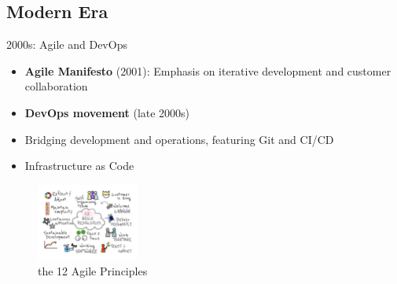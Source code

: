 \documentclass{beamer}
\begin{document}
\subsection{Modern Era}

\begin{frame}[t]{2000s: Agile and DevOps}
    \begin{itemize}
        \item \textbf{Agile Manifesto} (2001):  Emphasis on iterative development and customer collaboration
        \item \textbf{DevOps movement} (late 2000s)
        \item Bridging development and operations, featuring Git and CI/CD
        \item Infrastructure as Code
    \end{itemize}
    \begin{figure}
        \includegraphics[width=0.3\textwidth]{images/agile-manifesto.png}
        \caption{the 12 Agile Principles}
    \end{figure}
\end{frame}
\end{document}
